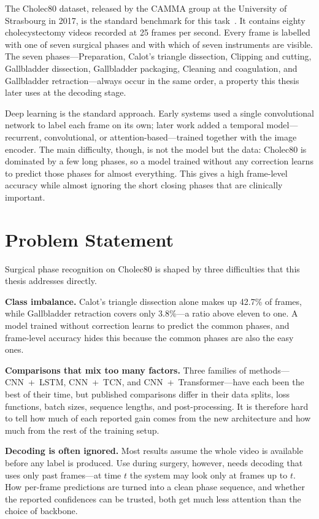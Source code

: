 \documentclass[11pt,a4paper]{report}
\begin{document}
The Cholec80 dataset, released by the CAMMA group at the University of Strasbourg in 2017, is the standard benchmark for this task~\cite{twinanda2017endonet}. It contains eighty cholecystectomy videos recorded at 25 frames per second. Every frame is labelled with one of seven surgical phases and with which of seven instruments are visible. The seven phases---Preparation, Calot's triangle dissection, Clipping and cutting, Gallbladder dissection, Gallbladder packaging, Cleaning and coagulation, and Gallbladder retraction---always occur in the same order, a property this thesis later uses at the decoding stage.

Deep learning is the standard approach. Early systems used a single convolutional network to label each frame on its own; later work added a temporal model---recurrent, convolutional, or attention-based---trained together with the image encoder. The main difficulty, though, is not the model but the data: Cholec80 is dominated by a few long phases, so a model trained without any correction learns to predict those phases for almost everything. This gives a high frame-level accuracy while almost ignoring the short closing phases that are clinically important.

\section{Problem Statement}

Surgical phase recognition on Cholec80 is shaped by three difficulties that this thesis addresses directly.

\textbf{Class imbalance.} Calot's triangle dissection alone makes up 42.7\% of frames, while Gallbladder retraction covers only 3.8\%---a ratio above eleven to one. A model trained without correction learns to predict the common phases, and frame-level accuracy hides this because the common phases are also the easy ones.

\textbf{Comparisons that mix too many factors.} Three families of methods---CNN~+~LSTM, CNN~+~TCN, and CNN~+~Transformer---have each been the best of their time, but published comparisons differ in their data splits, loss functions, batch sizes, sequence lengths, and post-processing. It is therefore hard to tell how much of each reported gain comes from the new architecture and how much from the rest of the training setup.

\textbf{Decoding is often ignored.} Most results assume the whole video is available before any label is produced. Use during surgery, however, needs decoding that uses only past frames---at time $t$ the system may look only at frames up to $t$. How per-frame predictions are turned into a clean phase sequence, and whether the reported confidences can be trusted, both get much less attention than the choice of backbone.
\end{document}

